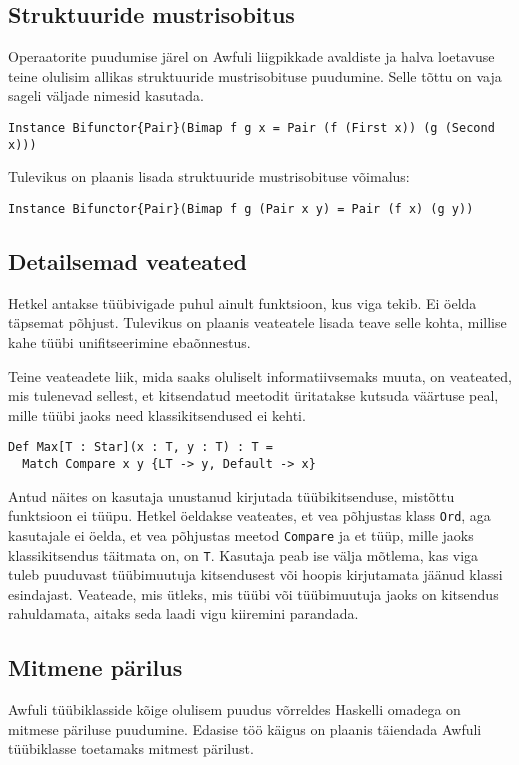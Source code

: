 \documentclass[12pt]{article}
\begin{document}
    \subsection{Struktuuride mustrisobitus}
      Operaatorite puudumise järel on Awfuli liigpikkade avaldiste ja halva loetavuse teine olulisim allikas struktuuride mustrisobituse puudumine. Selle tõttu on vaja sageli väljade nimesid kasutada.

      \begin{verbatim}Instance Bifunctor{Pair}(Bimap f g x = Pair (f (First x)) (g (Second x)))\end{verbatim}

      Tulevikus on plaanis lisada struktuuride mustrisobituse võimalus:

      \begin{verbatim}Instance Bifunctor{Pair}(Bimap f g (Pair x y) = Pair (f x) (g y))\end{verbatim}
    \subsection{Detailsemad veateated}
      Hetkel antakse tüübivigade puhul ainult funktsioon, kus viga tekib. Ei öelda täpsemat põhjust. Tulevikus on plaanis veateatele lisada teave selle kohta, millise kahe tüübi unifitseerimine ebaõnnestus.

      Teine veateadete liik, mida saaks oluliselt informatiivsemaks muuta, on veateated, mis tulenevad sellest, et kitsendatud meetodit üritatakse kutsuda väärtuse peal, mille tüübi jaoks need klassikitsendused ei kehti.

      \begin{verbatim}Def Max[T : Star](x : T, y : T) : T =
  Match Compare x y {LT -> y, Default -> x}\end{verbatim}

      Antud näites on kasutaja unustanud kirjutada tüübikitsenduse, mistõttu funktsioon ei tüüpu. Hetkel öeldakse veateates, et vea põhjustas klass \verb!Ord!, aga kasutajale ei öelda, et vea põhjustas meetod \verb!Compare! ja et tüüp, mille jaoks klassikitsendus täitmata on, on \verb!T!. Kasutaja peab ise välja mõtlema, kas viga tuleb puuduvast tüübimuutuja kitsendusest või hoopis kirjutamata jäänud klassi esindajast. Veateade, mis ütleks, mis tüübi või tüübimuutuja jaoks on kitsendus rahuldamata, aitaks seda laadi vigu kiiremini parandada.
    \subsection{Mitmene pärilus}
      Awfuli tüübiklasside kõige olulisem puudus võrreldes Haskelli omadega on mitmese päriluse puudumine. Edasise töö käigus on plaanis täiendada Awfuli tüübiklasse toetamaks mitmest pärilust.
\end{document}
